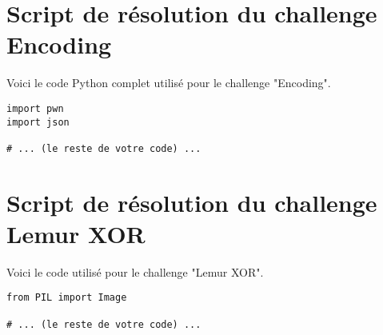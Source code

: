 
\section{Script de résolution du challenge Encoding}
\label{annexe:script-encoding}

Voici le code Python complet utilisé pour le challenge "Encoding".

\begin{verbatim}
import pwn
import json

# ... (le reste de votre code) ...
\end{verbatim}

\section{Script de résolution du challenge Lemur XOR}
\label{annexe:script-lemur}

Voici le code utilisé pour le challenge "Lemur XOR".

\begin{verbatim}
from PIL import Image

# ... (le reste de votre code) ...
\end{verbatim}